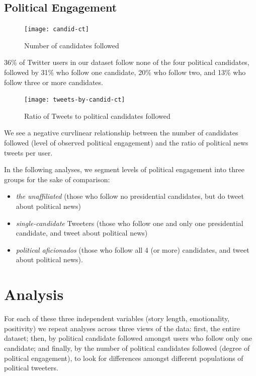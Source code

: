 \documentclass[letterpaper]{article}
\begin{document}
\subsection{Political Engagement}



\begin{figure}[t!]  
\centering 
  \texttt{[image: candid-ct]}  
  \caption{Number of candidates followed
    \label{fig:candid-ct}}
\end{figure}

36\% of Twitter users in our dataset follow none of the four political candidates, followed by 31\% who follow one candidate, 20\% who follow two, and 13\% who follow three or more candidates. 


\begin{figure}[t!]  
\centering 
  \texttt{[image: tweets-by-candid-ct]}  
  \caption{Ratio of Tweets to political candidates followed
    \label{fig:candid-ct}}
\end{figure}

We see a negative curvlinear relationship between the number of candidates followed (level of observed political engagement) and the ratio of political news tweets per user.


In the following analyses, we segment levels of political engagement into three groups for the sake of comparison:

\begin{itemize}
  \item \emph{the unaffiliated} (those who follow no presidential candidates, but do tweet about political news)
  \item \emph{single-candidate} Tweeters (those who follow one and only one presidential candidate, and tweet about political news)
  \item \emph{political aficionados} (those who follow all 4 (or more) candidates, and tweet about political news).
\end{itemize}


\section{Analysis} 
For each of these three independent variables (story length, emotionality, positivity) we repeat analyses across three views of the data: first, the entire dataset; then, by political candidate followed amongst users who follow only one candidate; and finally, by the number of political candidates followed (degree of political engagement), to look for differences amongst different populations of political tweeters.
\end{document}
